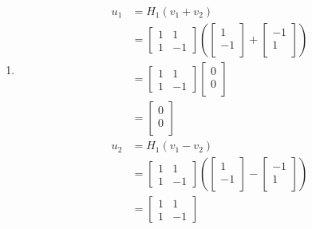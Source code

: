 \documentclass[11pt]{article}
\begin{document}
\begin{enumerate}
	\item 
	\begin{align*}
		u_1 &= H_1(v_1 + v_2) \\
			&= 
				\begin{bmatrix} 
					1 & 1 \\ 
					1 & -1 
				\end{bmatrix}
				(
				\begin{bmatrix} 
					1  \\ 
					-1 \\
				\end{bmatrix}
				+
				\begin{bmatrix} 
					-1  \\ 
					1 \\
				\end{bmatrix}	
				)	\\	
			&= 	
				\begin{bmatrix} 
					1 & 1 \\ 
					1 & -1 
				\end{bmatrix}
				\begin{bmatrix} 
					0  \\ 
					0 \\
				\end{bmatrix}	\\
			&= 
				\begin{bmatrix} 
					0  \\ 
					0 \\
				\end{bmatrix}					
	\end{align*}
	\begin{align*}
		u_2 &= H_1(v_1 - v_2) \\
			&= 
				\begin{bmatrix} 
					1 & 1 \\ 
					1 & -1 
				\end{bmatrix}
				(
				\begin{bmatrix} 
					1  \\ 
					-1 \\
				\end{bmatrix}
				-
				\begin{bmatrix} 
					-1  \\ 
					1 \\
				\end{bmatrix}	
				)	\\	
			&= 	
				\begin{bmatrix} 
					1 & 1 \\ 
					1 & -1 
				\end{bmatrix}

\end{align*}
\end{enumerate}
\end{document}
